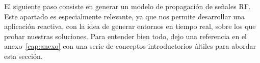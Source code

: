 El siguiente paso consiste en generar un modelo de propagación de señales \ac{RF}. Este apartado es especialmente relevante, ya que nos permite desarrollar una aplicación reactiva, con la idea de generar entornos en tiempo real, sobre los que probar nuestras soluciones. Para entender bien todo, dejo una referencia en el anexo~\ref{cap:anexo} con una serie de conceptos introductorios últiles para abordar esta sección.\\











